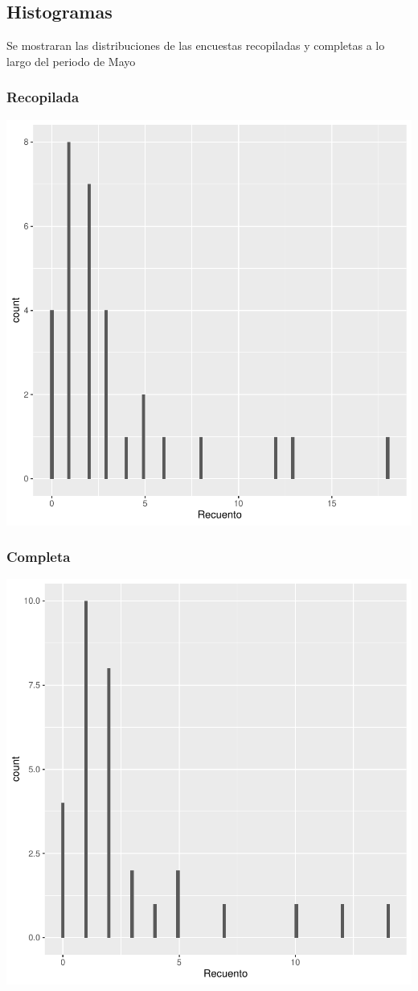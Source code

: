 \documentclass{article}
\begin{document}
\subsection{Histogramas}
Se mostraran las distribuciones de las encuestas recopiladas y completas a lo largo del periodo de Mayo

\subsubsection{Recopilada}

\includegraphics{seguimento2-082}

\subsubsection{Completa}

\includegraphics{seguimento2-083}
\end{document}
